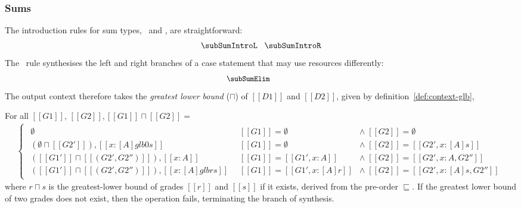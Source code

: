 \subsubsection{Sums}
The introduction rules for sum types, \subSumIntroLname\ and \subSumIntroRname, are straightforward:
\begin{align*}
  \subSumIntroL
\;\;\;
  \subSumIntroR
\end{align*}
The \subSumElimName\ rule synthesises the left and
right branches of a case statement that may use resources
differently:
\begin{align*}
\begin{array}{c}
\hspace{-3em}{\small{\subSumElim}}
\end{array}
\end{align*}
The output context therefore takes the \textit{greatest
lower bound} ($\sqcap$) of $[[ D1 ]]$ and $[[ D2 ]]$, given by definition~\ref{def:context-glb},
\begin{definition}\label{def:context-glb}
For all $[[ G1 ]]$, $[[ G2 ]], [[G1]] \sqcap [[G2]] =$
\begin{align*}
\label{def:lub}
\left\{\begin{matrix}
\begin{array}{lll}
\emptyset
  & [[ G1 ]] = \emptyset & \wedge \; [[ G2 ]] = \emptyset
\\
%
(\emptyset \sqcap [[ G2' ]]), [[ x : [ A ] {glb 0 s} ]]
  & [[ G1 ]] = \emptyset & \wedge \; [[G2]] = [[ G2',x : [A] s]]
\\
%
([[G1']] \sqcap [[(G2',G2'')]]), [[x : A]]
 & [[G1]] = [[{G1', x : A} ]] & \wedge \; [[ G2 ]] = [[ {G2', x : A}, G2'' ]]
\\
%
([[G1']] \sqcap [[(G2',G2'')]]), [[x : [A] {glb r s}]]\;\;
 & [[G1]] = [[ G1',x : [A] r]] & \wedge \; [[ G2 ]] = [[{G2', x : [A] s}, G2'']]
\end{array}
\end{matrix}\right.
\end{align*}
where $r\!\sqcap\!s$ is the greatest-lower bound of grades $[[r]]$
and $[[s]]$ if it exists, derived from the pre-order $\sqsubseteq$. If 
the greatest lower bound of two grades does not exist, then the operation fails, 
terminating the branch of synthesis.
\end{definition}
%
%

